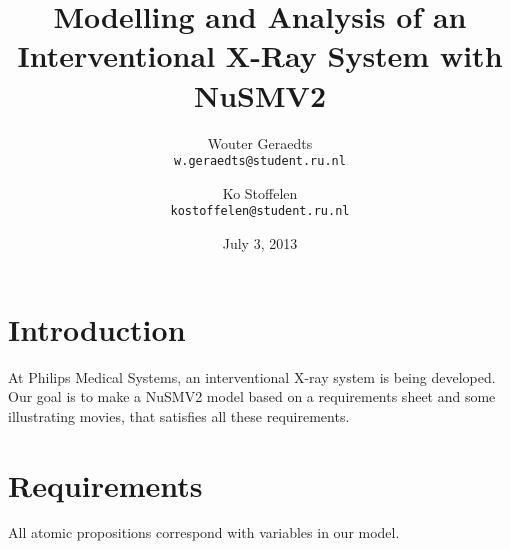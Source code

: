 \documentclass[a4paper,10pt]{article}
\title{Modelling and Analysis of an Interventional X-Ray System with NuSMV2}
\author{
	Wouter Geraedts \\ \small{\texttt{w.geraedts@student.ru.nl}} \and
	Ko Stoffelen     \\ \small{\texttt{kostoffelen@student.ru.nl}}
}
\date{July 3, 2013}
\begin{document}
	\maketitle

	\section{Introduction}
	At Philips Medical Systems, an interventional X-ray system is being developed. Our goal is to make a NuSMV2 model based on a requirements sheet and some illustrating movies, that satisfies all these requirements.

	\section{Requirements}
	All atomic propositions correspond with variables in our model.
\end{document}

